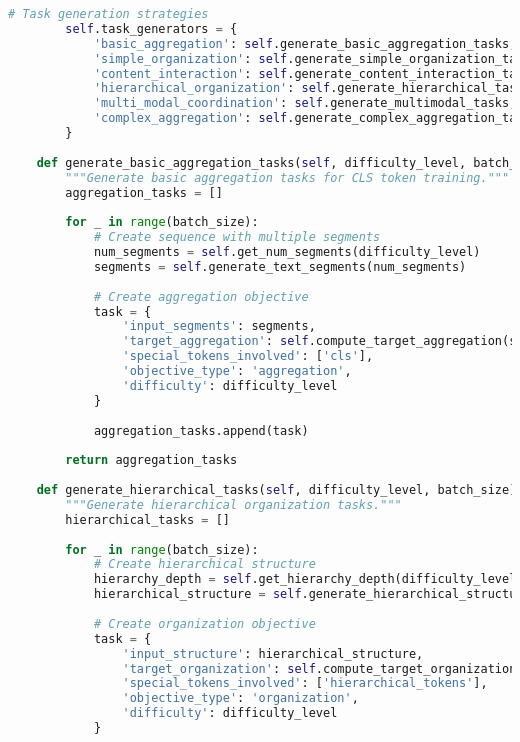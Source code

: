 \begin{lstlisting}[language=Python, caption=Progressive curriculum framework for special token pretraining]
        # Task generation strategies
        self.task_generators = {
            'basic_aggregation': self.generate_basic_aggregation_tasks,
            'simple_organization': self.generate_simple_organization_tasks,
            'content_interaction': self.generate_content_interaction_tasks,
            'hierarchical_organization': self.generate_hierarchical_tasks,
            'multi_modal_coordination': self.generate_multimodal_tasks,
            'complex_aggregation': self.generate_complex_aggregation_tasks
        }
    
    def generate_basic_aggregation_tasks(self, difficulty_level, batch_size):
        """Generate basic aggregation tasks for CLS token training."""
        aggregation_tasks = []
        
        for _ in range(batch_size):
            # Create sequence with multiple segments
            num_segments = self.get_num_segments(difficulty_level)
            segments = self.generate_text_segments(num_segments)
            
            # Create aggregation objective
            task = {
                'input_segments': segments,
                'target_aggregation': self.compute_target_aggregation(segments),
                'special_tokens_involved': ['cls'],
                'objective_type': 'aggregation',
                'difficulty': difficulty_level
            }
            
            aggregation_tasks.append(task)
        
        return aggregation_tasks
    
    def generate_hierarchical_tasks(self, difficulty_level, batch_size):
        """Generate hierarchical organization tasks."""
        hierarchical_tasks = []
        
        for _ in range(batch_size):
            # Create hierarchical structure
            hierarchy_depth = self.get_hierarchy_depth(difficulty_level)
            hierarchical_structure = self.generate_hierarchical_structure(hierarchy_depth)
            
            # Create organization objective
            task = {
                'input_structure': hierarchical_structure,
                'target_organization': self.compute_target_organization(hierarchical_structure),
                'special_tokens_involved': ['hierarchical_tokens'],
                'objective_type': 'organization',
                'difficulty': difficulty_level
            }
            

\end{lstlisting}
